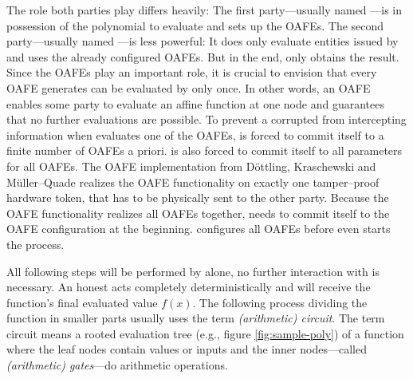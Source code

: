 The role both parties play differs heavily: The first party---usually named
\JWpOne{}---is in possession of the polynomial to evaluate and sets up the
OAFEs.  The second party---usually named \JWpTwo{}---is less powerful: It does
only evaluate entities issued by \JWpOne{} and uses the already configured
OAFEs. But in the end, only \JWpTwo{} obtains the result.  Since the OAFEs play
an important role, it is crucial to envision that every OAFE \JWpOne{} generates
can be evaluated by \JWpTwo{} only once. In other words, an OAFE enables some
party to evaluate an affine function at one node and guarantees that no further
evaluations are possible. To prevent a corrupted \JWpOne{} from intercepting
information when \JWpTwo{} evaluates one of the OAFEs, \JWpOne{} is forced to
commit itself to a finite number of OAFEs a priori. \JWpOne{} is also forced to
commit itself to all parameters for all OAFEs. The OAFE implementation from
Döttling, Kraschewski and Müller--Quade\cite{davidgoliath} realizes the OAFE
functionality on exactly one tamper--proof hardware token, that has to be
physically sent to the other party. Because the OAFE functionality realizes all
OAFEs together, \JWpOne{} needs to commit itself to the OAFE configuration at
the beginning. \JWpOne{} configures all OAFEs before \JWpTwo{} even starts the
process.

All following steps will be performed by \JWpTwo{} alone, no further interaction
with \JWpOne{} is necessary. An honest \JWpTwo{} acts completely
deterministically and will receive the function's final evaluated value $f(x)$.
The following process dividing the function in smaller parts usually uses the
term \emph{(arithmetic) circuit}. The term circuit means a rooted evaluation
tree (e.g., figure \ref{fig:sample-poly}) of a function where the leaf nodes
contain values or inputs and the inner nodes---called \emph{(arithmetic)
gates}---do arithmetic operations.

